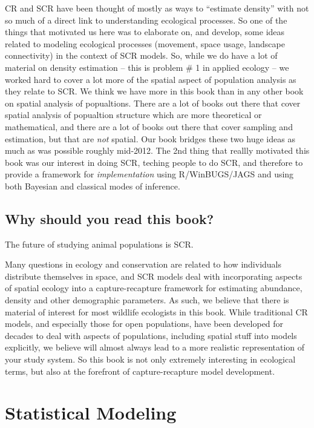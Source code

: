 CR and SCR have been thought of mostly as ways to ``estimate density''
with not so much of a direct link to understanding ecological
processes. So one of the things that motivated us here was to
elaborate on, and develop, some ideas related to modeling ecological
processes (movement, space usage, landscape connectivity) in the
context of SCR models.  So, while we do have a lot of material on
density estimation -- this is problem \# 1 in applied ecology -- we
worked hard to cover a lot more of the spatial aspect of population
analysis as they relate to SCR. We think we have more in this book
than in any other book on spatial analysis of popualtions. There are a
lot of books out there that cover spatial analysis of popualtion
structure which are more theoretical or mathematical, and there are a
lot of books out there that cover sampling and estimation, but that
are {\it not} spatial. Our book bridges these two huge ideas as much
as was possible roughly mid-2012.  The 2nd thing that reallly
motivated this book was our interest in doing SCR, teching people to
do SCR, and therefore to provide a framework for {\it implementation}
using R/WinBUGS/JAGS and using both Bayesian and classical modes of
inference.  





\subsection*{Why should you read this book?} 

The future of studying animal populations is SCR.  


Many questions in ecology and conservation are related to 
how individuals distribute themselves in space, and SCR models deal 
with incorporating aspects of spatial ecology into a capture-recapture 
framework for estimating abundance, density and other demographic 
parameters. As such, we believe that there is material of interest for 
most wildlife ecologists in this book. While traditional CR models, 
and especially those for open populations, have been developed for 
decades to deal with aspects of populations, including spatial stuff 
into models explicitly, we believe will almost always lead to a more 
realistic representation of your study system.  So this book is not 
only extremely interesting in ecological terms, but also at the 
forefront of capture-recapture model development. 


\section*{Statistical Modeling}

